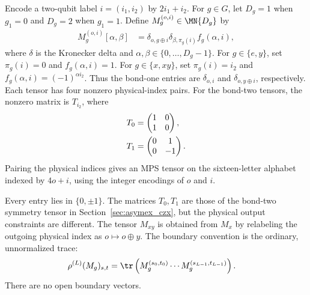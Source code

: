 \begin{definition}%
    \label{def:asymex_z2z2_tensors}
    \leanok
    Encode a two-qubit label $i=(i_1,i_2)$ by $2i_1+i_2$.
    For $g\in G$, let $D_g=1$ when $g_1=0$ and $D_g=2$ when
    $g_1=1$. Define $M_g^{(o,i)}\in\MN{D_g}$ by
    \begin{align}
        M_g^{(o,i)}[\alpha,\beta]
         & =\delta_{o,g\oplus i}\delta_{\beta,\pi_g(i)}f_g(\alpha,i),
        \label{eq:asymex_z2z2_tensor}
    \end{align}
    where $\delta$ is the Kronecker delta and
    $\alpha,\beta\in\{0,\ldots,D_g-1\}$.
    For $g\in\{e,y\}$, set $\pi_g(i)=0$ and $f_g(\alpha,i)=1$.
    For $g\in\{x,xy\}$, set $\pi_g(i)=i_2$ and
    $f_g(\alpha,i)=(-1)^{\alpha i_2}$.
    Thus the bond-one entries are $\delta_{o,i}$ and
    $\delta_{o,y\oplus i}$, respectively.
    Each tensor has four nonzero physical-index pairs.
    For the bond-two tensors, the nonzero matrix is $T_{i_2}$, where
    \begin{align}
        T_0 & =\begin{pmatrix}1&0\\1&0\end{pmatrix}, \notag \\
        T_1 & =\begin{pmatrix}0&1\\0&-1\end{pmatrix}.
        \label{eq:asymex_z2z2_local_matrices}
    \end{align}
    Pairing the physical indices gives an MPS tensor on the
    sixteen-letter alphabet indexed by $4o+i$, using the integer
    encodings of $o$ and $i$.
\end{definition}

Every entry lies in $\{0,\pm1\}$.
The matrices $T_0,T_1$ are those of the bond-two symmetry tensor in
Section~\ref{sec:asymex_czx}, but the physical output constraints
are different.
The tensor $M_{xy}$ is obtained from $M_x$ by relabeling the outgoing
physical index as $o\mapsto o\oplus y$.
The boundary convention is the ordinary, unnormalized trace:
\begin{align}
    \rho^{(L)}(M_g)_{s,t}
     & =\tr\left(M_g^{(s_0,t_0)}\cdots
    M_g^{(s_{L-1},t_{L-1})}\right).
    \label{eq:asymex_z2z2_trace_boundary}
\end{align}
There are no open boundary vectors.

